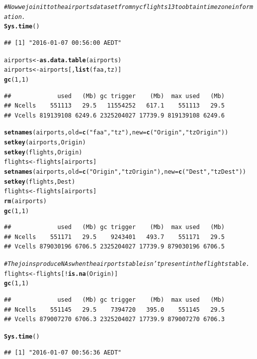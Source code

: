 \documentclass{scrreprt}\usepackage[]{graphicx}\usepackage[]{color}
\makeatletter
\newcommand{\hlnum}[1]{\textcolor[rgb]{0.686,0.059,0.569}{#1}}%
\newcommand{\hlstr}[1]{\textcolor[rgb]{0.192,0.494,0.8}{#1}}%
\newcommand{\hlcom}[1]{\textcolor[rgb]{0.678,0.584,0.686}{\textit{#1}}}%
\newcommand{\hlopt}[1]{\textcolor[rgb]{0,0,0}{#1}}%
\newcommand{\hlstd}[1]{\textcolor[rgb]{0.345,0.345,0.345}{#1}}%
\newcommand{\hlkwb}[1]{\textcolor[rgb]{0.69,0.353,0.396}{#1}}%
\newcommand{\hlkwc}[1]{\textcolor[rgb]{0.333,0.667,0.333}{#1}}%
\newcommand{\hlkwd}[1]{\textcolor[rgb]{0.737,0.353,0.396}{\textbf{#1}}}%
\newenvironment{kframe}{%
 \def\at@end@of@kframe{}%
 \ifinner\ifhmode%
  \def\at@end@of@kframe{\end{minipage}}%
  \begin{minipage}{\columnwidth}%
 \fi\fi%
 \def\FrameCommand##1{\hskip\@totalleftmargin \hskip-\fboxsep
 \colorbox{shadecolor}{##1}\hskip-\fboxsep
     \hskip-\linewidth \hskip-\@totalleftmargin \hskip\columnwidth}%
 \MakeFramed {\advance\hsize-\width
   \@totalleftmargin\z@ \linewidth\hsize
   \@setminipage}}%
 {\par\unskip\endMakeFramed%
 \at@end@of@kframe}
\newenvironment{knitrout}{}{} %
\makeatother
\begin{document}
\begin{knitrout}
\color{fgcolor}\begin{kframe}
\begin{alltt}
\hlcom{# Now we join it to the airports dataset from nycflights13 to obtain time zone information.}
\hlkwd{Sys.time}\hlstd{()}
\end{alltt}
\begin{verbatim}
## [1] "2016-01-07 00:56:00 AEDT"
\end{verbatim}
\begin{alltt}
\hlstd{airports} \hlkwb{<-} \hlkwd{as.data.table}\hlstd{(airports)}
\hlstd{airports} \hlkwb{<-} \hlstd{airports[,}\hlkwd{list}\hlstd{(faa, tz)]}
\hlkwd{gc}\hlstd{(}\hlnum{1}\hlstd{,}\hlnum{1}\hlstd{)}
\end{alltt}
\begin{verbatim}
##             used   (Mb) gc trigger    (Mb)  max used   (Mb)
## Ncells    551113   29.5   11554252   617.1    551113   29.5
## Vcells 819139108 6249.6 2325204027 17739.9 819139108 6249.6
\end{verbatim}
\begin{alltt}
\hlkwd{setnames}\hlstd{(airports,} \hlkwc{old} \hlstd{=} \hlkwd{c}\hlstd{(}\hlstr{"faa"}\hlstd{,} \hlstr{"tz"}\hlstd{),} \hlkwc{new} \hlstd{=} \hlkwd{c}\hlstd{(}\hlstr{"Origin"}\hlstd{,} \hlstr{"tzOrigin"}\hlstd{))}
\hlkwd{setkey}\hlstd{(airports, Origin)}
\hlkwd{setkey}\hlstd{(flights, Origin)}
\hlstd{flights} \hlkwb{<-} \hlstd{flights[airports]}
\hlkwd{setnames}\hlstd{(airports,} \hlkwc{old} \hlstd{=} \hlkwd{c}\hlstd{(}\hlstr{"Origin"}\hlstd{,} \hlstr{"tzOrigin"}\hlstd{),} \hlkwc{new} \hlstd{=} \hlkwd{c}\hlstd{(}\hlstr{"Dest"}\hlstd{,} \hlstr{"tzDest"}\hlstd{))}
\hlkwd{setkey}\hlstd{(flights, Dest)}
\hlstd{flights} \hlkwb{<-} \hlstd{flights[airports]}
\hlkwd{rm}\hlstd{(airports)}
\hlkwd{gc}\hlstd{(}\hlnum{1}\hlstd{,}\hlnum{1}\hlstd{)}
\end{alltt}
\begin{verbatim}
##             used   (Mb) gc trigger    (Mb)  max used   (Mb)
## Ncells    551171   29.5    9243401   493.7    551171   29.5
## Vcells 879030196 6706.5 2325204027 17739.9 879030196 6706.5
\end{verbatim}
\begin{alltt}
\hlcom{# The joins produce NAs when the airports table isn't present in the flights table.}
\hlstd{flights} \hlkwb{<-} \hlstd{flights[}\hlopt{!}\hlkwd{is.na}\hlstd{(Origin)]}
\hlkwd{gc}\hlstd{(}\hlnum{1}\hlstd{,}\hlnum{1}\hlstd{)}
\end{alltt}
\begin{verbatim}
##             used   (Mb) gc trigger    (Mb)  max used   (Mb)
## Ncells    551145   29.5    7394720   395.0    551145   29.5
## Vcells 879007270 6706.3 2325204027 17739.9 879007270 6706.3
\end{verbatim}
\begin{alltt}
\hlkwd{Sys.time}\hlstd{()}
\end{alltt}
\begin{verbatim}
## [1] "2016-01-07 00:56:36 AEDT"
\end{verbatim}
\end{kframe}
\end{knitrout}
\end{document}
